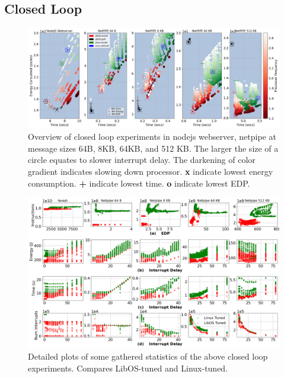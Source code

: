 \subsection{Closed Loop}
\label{sec:closed_loop}
\begin{figure}
\centering
\includegraphics[width=1\textwidth]{figures/closed_loop_overview.png}
\vspace*{-9mm}
\caption[]
{Overview of closed loop experiments in nodejs webserver, netpipe at message sizes 64B, 8KB, 64KB, and 512 KB. The larger the size of a circle equates to slower interrupt delay. The darkening of color gradient indicates slowing down processor. \textbf{x} indicate lowest energy consumption. \textbf{+} indicate lowest time. \textbf{o} indicate lowest EDP.}
\label{fig:closed_loop_overview}
\end{figure}
\begin{figure}
\centering
\includegraphics[width=1\textwidth]{figures/closed_detail_1.png}
\vspace*{-9mm}
\caption[]
{Detailed plots of some gathered statistics of the above closed loop experiments. Compares LibOS-tuned and Linux-tuned.}
\label{fig:closed_loop_detail_1}
\end{figure}
